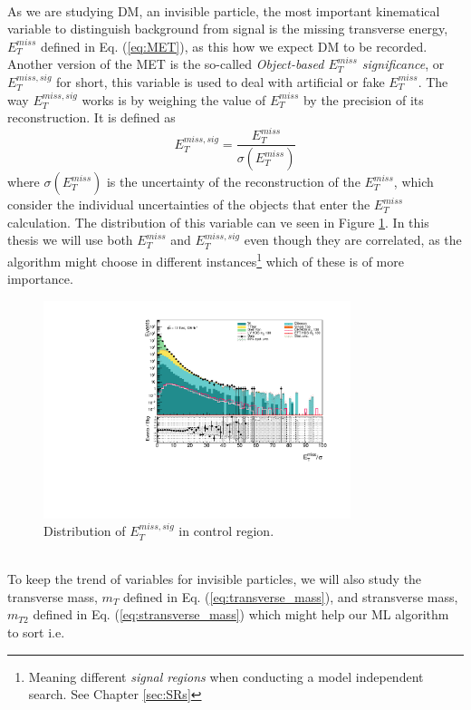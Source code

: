 \documentclass[12pt, a4paper]{book}
\begin{document}
\\As we are studying DM, an invisible particle, the most important kinematical variable to distinguish background from signal is the missing transverse energy, $E_T^{miss}$ defined in Eq. (\ref{eq:MET}), as this how we expect DM to be recorded.
Another version of the MET is the so-called \textit{Object-based $E_T^{miss}$ significance}, or $E_T^{miss,sig}$ for short, this variable is used to deal with artificial or fake $E_T^{miss}$. The way $E_T^{miss,sig}$ works is by 
weighing the value of $E_T^{miss}$ by the precision of its reconstruction. It is defined as
\begin{equation}\label{eq:METsig}
    E_T^{miss,sig} = \frac{E_T^{miss}}{\sigma(E_T^{miss})}
\end{equation}
where $\sigma(E_T^{miss})$ is the uncertainty of the reconstruction of the $E_T^{miss}$, which consider the individual uncertainties of the objects that enter the $E_T^{miss}$ calculation. The distribution of this variable can ve seen in Figure \ref{fig:met_sig_dist}. 
In this thesis we will use both $E_T^{miss}$ and $E_T^{miss,sig}$ even though they are correlated, as the algorithm might choose in different instances\footnote{Meaning different \textit{signal regions} when conducting a model independent search. See Chapter \ref{sec:SRs}} 
which of these is of more importance.\\
\begin{figure}[!ht]
    \centering
        \includegraphics[width=0.8\textwidth]{met_sig.pdf}
    \caption{Distribution of $E_{T}^{miss,sig}$ in control region.}\label{fig:met_sig_dist}
\end{figure}
\\To keep the trend of variables for invisible particles, we will also study the transverse mass, $m_T$ defined in Eq. (\ref{eq:transverse_mass}), and stransverse mass, $m_{T2}$ defined in Eq. (\ref{eq:stransverse_mass}) which might help our ML algorithm to sort i.e. 
\end{document}

